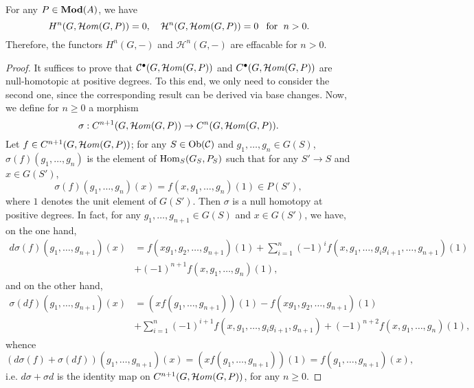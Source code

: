 \begin{lemma}\label{category presheaf group module cohomology of coinduction zero}
For any $P\in\mathbf{Mod}(A)$, we have
\[H^n(G,\operatorname{\mathcal{H}\hspace*{-0.4pt}\textit{om}\hspace{0.5pt}}(G,P))=0,\quad \mathcal{H}^n(G,\operatorname{\mathcal{H}\hspace*{-0.4pt}\textit{om}\hspace{0.5pt}}(G,P))=0\hspace{8pt}\text{for}\hspace{6pt} n>0.\]
Therefore, the functors $H^n(G,-)$ and $\mathcal{H}^n(G,-)$ are effacable for $n>0$.
\end{lemma}
\begin{proof}
It suffices to prove that $\mathcal{C}^\bullet(G,\operatorname{\mathcal{H}\hspace*{-0.4pt}\textit{om}\hspace{0.5pt}}(G,P))$ and $C^\bullet(G,\operatorname{\mathcal{H}\hspace*{-0.4pt}\textit{om}\hspace{0.5pt}}(G,P))$ are null-homotopic at positive degrees. To this end, we only need to consider the second one, since the corresponding result can be derived via base changes. Now, we define for $n\geq 0$ a morphism
\[\sigma:C^{n+1}(G,\operatorname{\mathcal{H}\hspace*{-0.4pt}\textit{om}\hspace{0.5pt}}(G,P))\to C^n(G,\operatorname{\mathcal{H}\hspace*{-0.4pt}\textit{om}\hspace{0.5pt}}(G,P)).\]
Let $f\in C^{n+1}(G,\operatorname{\mathcal{H}\hspace*{-0.4pt}\textit{om}\hspace{0.5pt}}(G,P))$; for any $S\in\mathrm{Ob}(\mathcal{C})$ and $g_1,\dots,g_n\in G(S)$, $\sigma(f)(g_1,\dots,g_n)$ is the element of $\mathrm{Hom}_S(G_S,P_S)$ such that for any $S'\to S$ and $x\in G(S')$, 
\[\sigma(f)(g_1,\dots,g_n)(x)=f(x,g_1,\dots,g_n)(1)\in P(S'),\]
where $1$ denotes the unit element of $G(S')$. Then $\sigma$ is a null homotopy at positive degrees. In fact, for any $g_1,\dots,g_{n+1}\in G(S)$ and $x\in G(S')$, we have, on the one hand,
\begin{align*}
d\sigma(f)(g_1,\dots,g_{n+1})(x)&=f(xg_1,g_2,\dots,g_{n+1})(1)+\sum_{i=1}^{n}(-1)^if(x,g_1,\dots,g_ig_{i+1},\dots,g_{n+1})(1)\\
&+(-1)^{n+1}f(x,g_1,\dots,g_n)(1),
\end{align*}
and on the other hand,
\begin{align*}
\sigma(df)(g_1,\dots,g_{n+1})(x)&=(xf(g_1,\dots,g_{n+1}))(1)-f(xg_1,g_2,\dots,g_{n+1})(1)\\
&+\sum_{i=1}^{n}(-1)^{i+1}f(x,g_1,\dots,g_ig_{i+1},g_{n+1})+(-1)^{n+2}f(x,g_1,\dots,g_n)(1),
\end{align*}
whence
\[(d\sigma(f)+\sigma(df))(g_1,\dots,g_{n+1})(x)=(xf(g_1,\dots,g_{n+1}))(1)=f(g_1,\dots,g_{n+1})(x),\]
i.e. $d\sigma+\sigma d$ is the identity map on $C^{n+1}(G,\operatorname{\mathcal{H}\hspace*{-0.4pt}\textit{om}\hspace{0.5pt}}(G,P))$, for any $n\geq 0$.
\end{proof}

